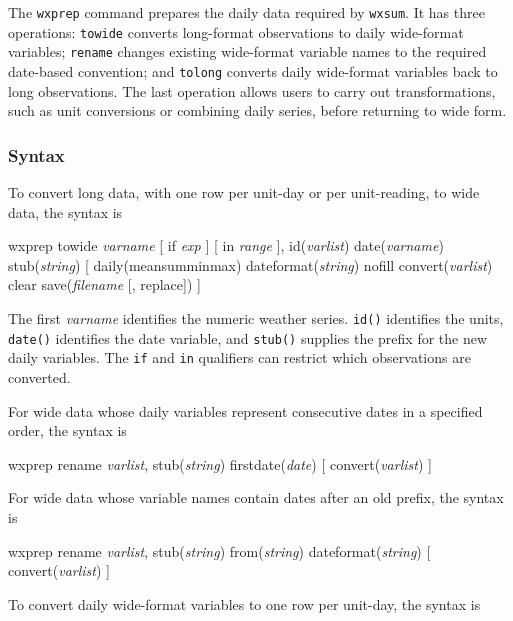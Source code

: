 The \texttt{wxprep} command prepares the daily data required by \texttt{wxsum}. It has three operations: \texttt{towide} converts long-format observations to daily wide-format variables; \texttt{rename} changes existing wide-format variable names to the required date-based convention; and \texttt{tolong} converts daily wide-format variables back to long observations. The last operation allows users to carry out transformations, such as unit conversions or combining daily series, before returning to wide form.

\subsubsection{Syntax}

To convert long data, with one row per unit-day or per unit-reading, to wide data, the syntax is

\begin{stsyntax}
	wxprep towide {\it varname\/} [ if {\it exp\/} ] [ in {\it range\/} ],
	id({\it varlist\/}) date({\it varname\/}) stub({\it string\/})
	[ daily(mean\textbar sum\textbar min\textbar max) dateformat({\it string\/})
	nofill convert({\it varlist\/}) clear
	save({\it filename\/} [, replace]) ]
\end{stsyntax}

\noindent The first \textit{varname} identifies the numeric weather series. \texttt{id()} identifies the units, \texttt{date()} identifies the date variable, and \texttt{stub()} supplies the prefix for the new daily variables. The \texttt{if} and \texttt{in} qualifiers can restrict which observations are converted.

For wide data whose daily variables represent consecutive dates in a specified order, the syntax is

\begin{stsyntax}
	wxprep rename {\it varlist\/}, stub({\it string\/}) firstdate({\it date\/})
	[ convert({\it varlist\/}) ]
\end{stsyntax}

\noindent For wide data whose variable names contain dates after an old prefix, the syntax is

\begin{stsyntax}
	wxprep rename {\it varlist\/}, stub({\it string\/})
	from({\it string\/}) dateformat({\it string\/})
	[ convert({\it varlist\/}) ]
\end{stsyntax}

To convert daily wide-format variables to one row per unit-day, the syntax is


